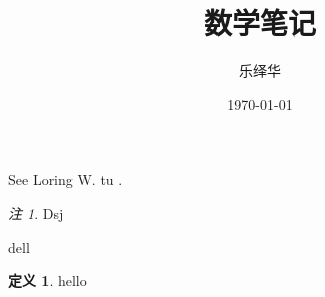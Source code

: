 \documentclass{ctexart}
\author{乐绎华}
\title{数学笔记}
\date{\today}
\theoremstyle{plain}
\theoremstyle{definition}
\newtheorem{definition}[theorem]{定义}
\theoremstyle{remark}
\newtheorem{note}[theorem]{注}
\begin{document}
\maketitle
\tableofcontents

See Loring W. tu .

\begin{note}
Dsj
\end{note}
dell

\begin{definition}
hello
\end{definition}
\[

\]
\end{document}
